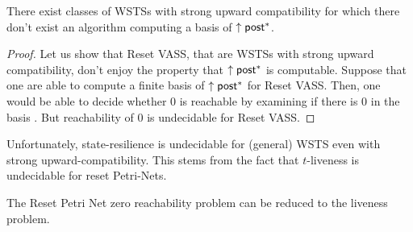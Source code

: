 \begin{proposition}
There exist classes of WSTSs with strong upward compatibility for which there don't exist an algorithm computing a basis of $\uparrow \textsf{post}^*$.
\end{proposition}


\begin{proof}
Let us show that Reset VASS, that are WSTSs with strong upward compatibility, don't enjoy the property that $\uparrow \textsf{post}^*$ is computable.
Suppose that one are able to compute a finite basis of $\uparrow \textsf{post}^*$ for Reset VASS. Then, one would be able to decide whether $0$ is reachable 
by examining if there is %
$0$ in the basis%
. But reachability of $0$  %
is undecidable for Reset VASS. 
\end{proof}



%
%
%






Unfortunately, state-resilience is undecidable for (general) WSTS even with strong upward-compatibility.
This stems from the fact that $t$-liveness is undecidable for reset Petri-Nets.


\begin{theorem}\label{liveness reset}
The  Reset Petri Net zero reachability problem can be reduced to the liveness problem.
\end{theorem}

